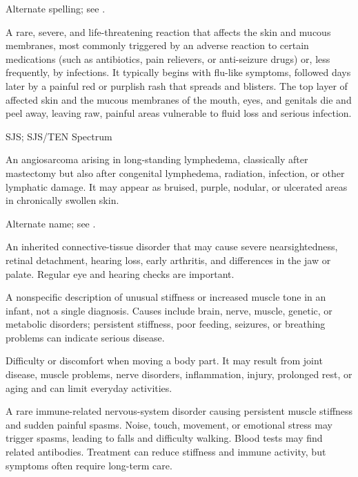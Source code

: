  Alternate spelling; see .

 A rare, severe, and life-threatening reaction that affects the skin and mucous membranes, most commonly triggered by an adverse reaction to certain medications (such as antibiotics, pain relievers, or anti-seizure drugs) or, less frequently, by infections. It typically begins with flu-like symptoms, followed days later by a painful red or purplish rash that spreads and blisters. The top layer of affected skin and the mucous membranes of the mouth, eyes, and genitals die and peel away, leaving raw, painful areas vulnerable to fluid loss and serious infection.

\synonyms
SJS; SJS/TEN Spectrum

 An angiosarcoma arising in long-standing lymphedema, classically after mastectomy but also after congenital lymphedema, radiation, infection, or other lymphatic damage. It may appear as bruised, purple, nodular, or ulcerated areas in chronically swollen skin.

 Alternate name; see .

 An inherited connective-tissue disorder that may cause severe nearsightedness, retinal detachment, hearing loss, early arthritis, and differences in the jaw or palate. Regular eye and hearing checks are important.

 A nonspecific description of unusual stiffness or increased muscle tone in an infant, not a single diagnosis. Causes include brain, nerve, muscle, genetic, or metabolic disorders; persistent stiffness, poor feeding, seizures, or breathing problems can indicate serious disease.

 Difficulty or discomfort when moving a body part. It may result from joint disease, muscle problems, nerve disorders, inflammation, injury, prolonged rest, or aging and can limit everyday activities.

 A rare immune-related nervous-system disorder causing persistent muscle stiffness and sudden painful spasms. Noise, touch, movement, or emotional stress may trigger spasms, leading to falls and difficulty walking. Blood tests may find related antibodies. Treatment can reduce stiffness and immune activity, but symptoms often require long-term care.

